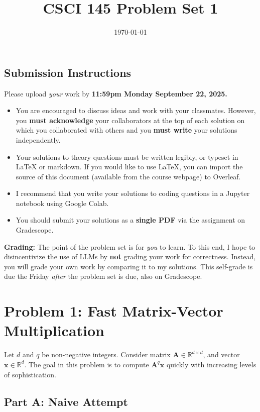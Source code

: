 \documentclass{article}
\title{CSCI 145 Problem Set 1}
\author{} %
\date{\today}
\begin{document}
\maketitle

\subsection*{Submission Instructions}

Please upload \textit{your} work by
\textbf{11:59pm Monday September 22, 2025.}
\begin{itemize}
\item You are encouraged to discuss ideas
and work with your classmates. However, you
\textbf{must acknowledge} your collaborators
at the top of each solution on which
you collaborated with others 
and you \textbf{must write} your solutions
independently.
\item Your solutions to theory questions must
be written legibly, or typeset in LaTeX or markdown.
If you would like to use LaTeX, you can import the source of this document (available from the course webpage) to Overleaf.
\item I recommend that you write your solutions to coding questions in a Jupyter notebook using Google Colab.
\item You should submit your solutions as a \textbf{single PDF} via the assignment on Gradescope.
\end{itemize}

\noindent
\textbf{Grading:} The point of the problem set is for \textit{you} to learn. To this end, I hope to disincentivize the use of LLMs by \textbf{not} grading your work for correctness. Instead, you will grade your own work by comparing it to my solutions. This self-grade is due the Friday \textit{after} the problem set is due, also on Gradescope.

\newpage \section*{Problem 1: Fast Matrix-Vector Multiplication}

Let $d$ and $q$ be non-negative integers.
Consider matrix $\mathbf{A} \in \mathbb{R}^{d \times d}$, and vector $\mathbf{x} \in \mathbb{R}^d$.
The goal in this problem is to compute $\mathbf{A}^q \mathbf{x}$ quickly with increasing levels of sophistication.

\subsection*{Part A: Naive Attempt}
\end{document}
